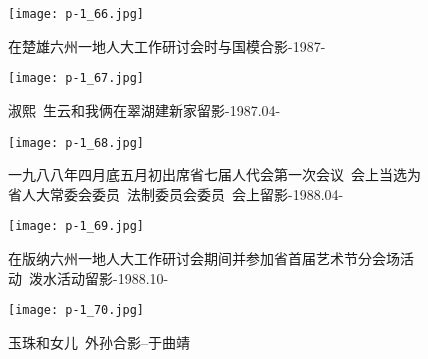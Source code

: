 \clearpage


\begin{figure}
    \begin{center}
        \texttt{[image: p-1\_66.jpg]}
        \begin{shaded}
            \caption{在楚雄六州一地人大工作研讨会时与国模合影-1987-}
        \end{shaded}
    \end{center}
\end{figure}

\clearpage


\begin{figure}
    \begin{center}
        \texttt{[image: p-1\_67.jpg]}
        \begin{shaded}
            \caption{淑熙~生云和我俩在翠湖建新家留影-1987.04-}
        \end{shaded}
    \end{center}
\end{figure}

\clearpage


\begin{figure}
    \begin{center}
        \texttt{[image: p-1\_68.jpg]}
        \begin{shaded}
            \caption{一九八八年四月底五月初出席省七届人代会第一次会议~会上当选为省人大常委会委员~法制委员会委员~会上留影-1988.04-}
        \end{shaded}
    \end{center}
\end{figure}

\clearpage


\begin{figure}
    \begin{center}
        \texttt{[image: p-1\_69.jpg]}
        \begin{shaded}
            \caption{在版纳六州一地人大工作研讨会期间并参加省首届艺术节分会场活动~泼水活动留影-1988.10-}
        \end{shaded}
    \end{center}
\end{figure}

\clearpage


\begin{figure}
    \begin{center}
        \texttt{[image: p-1\_70.jpg]}
        \begin{shaded}
            \caption{玉珠和女儿~外孙合影--于曲靖}
        \end{shaded}
    \end{center}
\end{figure}

